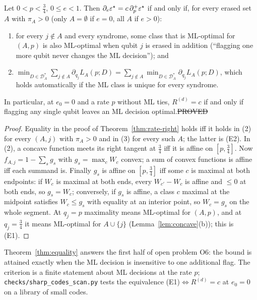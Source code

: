 \begin{theorem}\label{thm:equality}
Let $0<p<\tfrac34$, $0\le e<1$. Then $\partial_e\varepsilon^{\star}=c\,\partial_p^+\varepsilon^{\star}$ if and only if, for every erased set $A$ with $\pi_A>0$ (only $A=\emptyset$ if $e=0$, all $A$ if $e>0$):
\begin{enumerate}[(E1)]
\item for every $j\notin A$ and every syndrome, some class that is ML-optimal for $(A,p)$ is also ML-optimal when qubit $j$ is erased in addition (``flagging one more qubit never changes the ML decision''); and
\item $\min_{D\in\mathcal D^\ast_A}\sum_{j\notin A}\partial_{q_j}L_A(p;D)=\sum_{j\notin A}\min_{D\in\mathcal D^\ast_A}\partial_{q_j}L_A(p;D)$, which holds automatically if the ML class is unique for every syndrome.
\end{enumerate}
In particular, at $e_0=0$ and a rate $p$ without ML ties, $R^{(d)}=c$ if and only if flagging any single qubit leaves an ML decision optimal.\hfill\st{PROVED}
\end{theorem}
\begin{proof}
Equality in the proof of Theorem~\ref{thm:rate-right} holds iff it holds in (2) for every $(A,j)$ with $\pi_A>0$ and in (3) for every such $A$; the latter is (E2).
In (2), a concave function meets its right tangent at $\tfrac34$ iff it is affine on $[p,\tfrac34]$. Now $f_{A,j}=1-\sum_sg_s$ with $g_s=\max_cW_c$ convex; a sum of convex functions is affine iff each summand is.
Finally $g_s$ is affine on $[p,\tfrac34]$ iff some $c$ is maximal at both endpoints: if $W_c$ is maximal at both ends, every $W_{c'}-W_c$ is affine and $\le0$ at both ends, so $g_s=W_c$; conversely, if $g_s$ is affine, a class $c$ maximal at the midpoint satisfies $W_c\le g_s$ with equality at an interior point, so $W_c=g_s$ on the whole segment.
At $q_j=p$ maximality means ML-optimal for $(A,p)$, and at $q_j=\tfrac34$ it means ML-optimal for $A\cup\{j\}$ (Lemma~\ref{lem:concave}(b)); this is (E1).
\end{proof}

\noindent Theorem~\ref{thm:equality} answers the first half of open problem O6: the bound is attained exactly when the ML decision is insensitive to one additional flag. The criterion is a finite statement about ML decisions at the rate $p$; \texttt{checks/sharp\_codes\_scan.py} tests the equivalence (E1)$\Leftrightarrow R^{(d)}=c$ at $e_0=0$ on a library of small codes.

